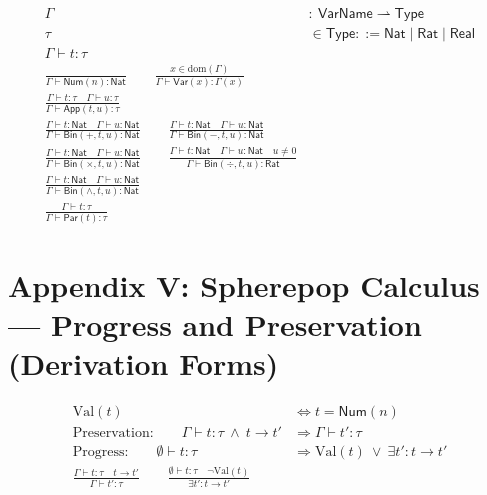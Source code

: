 \documentclass[11pt,oneside]{article}
\begin{document}
\begin{align}
\Gamma &:\ \mathsf{VarName} \rightharpoonup \mathsf{Type} \\[6pt]
\tau &\in \mathsf{Type} ::= \mathsf{Nat}\mid \mathsf{Rat}\mid \mathsf{Real} \\[10pt]

\Gamma \vdash t : \tau
\\[14pt]

\frac{}{ \Gamma \vdash \mathsf{Num}(n) : \mathsf{Nat}}
\qquad
\frac{x\in \mathrm{dom}(\Gamma)}{\Gamma \vdash \mathsf{Var}(x) : \Gamma(x)}
\\[16pt]

\frac{\Gamma \vdash t:\tau \quad \Gamma \vdash u:\tau}{\Gamma \vdash \mathsf{App}(t,u):\tau}
\\[16pt]

\frac{\Gamma \vdash t:\mathsf{Nat}\quad \Gamma \vdash u:\mathsf{Nat}}{\Gamma \vdash \mathsf{Bin}(+,t,u):\mathsf{Nat}}
\qquad
\frac{\Gamma \vdash t:\mathsf{Nat}\quad \Gamma \vdash u:\mathsf{Nat}}{\Gamma \vdash \mathsf{Bin}(-,t,u):\mathsf{Nat}}
\\[14pt]

\frac{\Gamma \vdash t:\mathsf{Nat}\quad \Gamma \vdash u:\mathsf{Nat}}{\Gamma \vdash \mathsf{Bin}(\times,t,u):\mathsf{Nat}}
\qquad
\frac{\Gamma \vdash t:\mathsf{Nat}\quad \Gamma \vdash u:\mathsf{Nat}\quad u\neq 0}{\Gamma \vdash \mathsf{Bin}(\div,t,u):\mathsf{Rat}}
\\[14pt]

\frac{\Gamma \vdash t:\mathsf{Nat}\quad \Gamma \vdash u:\mathsf{Nat}}{\Gamma \vdash \mathsf{Bin}(\wedge,t,u):\mathsf{Nat}}
\\[16pt]

\frac{\Gamma \vdash t:\tau}{\Gamma \vdash \mathsf{Par}(t):\tau}
\end{align}

\section{Appendix V: Spherepop Calculus --- Progress and Preservation (Derivation Forms)}

\begin{align}
\mathrm{Val}(t)
&\Longleftrightarrow
t=\mathsf{Num}(n)
\\[12pt]

\text{Preservation:}\qquad
\Gamma \vdash t:\tau \ \wedge\ t\to t'
&\Longrightarrow
\Gamma \vdash t':\tau
\\[14pt]

\text{Progress:}\qquad
\emptyset \vdash t:\tau
&\Longrightarrow
\mathrm{Val}(t)\ \vee\ \exists t': t\to t'
\\[16pt]

\frac{\Gamma \vdash t:\tau \quad t\to t'}{\Gamma \vdash t':\tau}
\qquad
\frac{\emptyset \vdash t:\tau \quad \neg\mathrm{Val}(t)}{\exists t': t\to t'}
\end{align}
\end{document}
